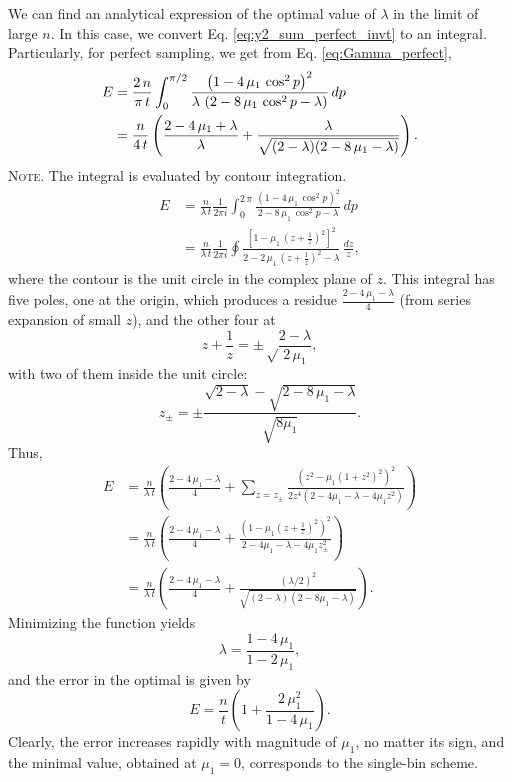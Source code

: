 \documentclass[reprint]{revtex4-1}
\newcommand{\note}[1]{{\color{DarkGreen}\footnotesize \textsc{Note.} #1}}
\newcommand{\Err}{E}
\begin{document}
We can find an analytical expression
of the optimal value of $\lambda$
in the limit of large $n$.
%
In this case,
we convert Eq.
\eqref{eq:y2_sum_perfect_invt}
to an integral.
%
Particularly,
for perfect sampling,
we get from Eq. \eqref{eq:Gamma_perfect},
$$
\begin{aligned}
\Err
&=
\frac{2 \, n}{\pi \, t}
\int_0^{\pi/2}
\frac{ \left(1 - 4 \, \mu_1 \, \cos^2 p \right)^2 }
{ \lambda \, \left(2 - 8 \, \mu_1 \, \cos^2 p - \lambda \right) }
\, dp
\notag \\
&=
\frac{n}{4 \, t}
\left(
  \frac{2 - 4 \, \mu_1 + \lambda}{ \lambda }
  +
  \frac{ \lambda }
  { \sqrt{ (2 - \lambda) (2 - 8 \, \mu_1 - \lambda) } }
\right).
\end{aligned}
$$
\note{The integral is evaluated by contour integration.
$$
\begin{aligned}
\Err
&=
\frac{n}{\lambda \, t}
\frac{1}{2 \pi i}
\int_0^{2 \, \pi}
\frac{ \left(1 - 4 \, \mu_1 \, \cos^2 p \right)^2 }
{ 2 - 8 \, \mu_1 \, \cos^2 p - \lambda }
\, dp
\\
&=
\frac{n}{\lambda \, t}
\frac{1}{2 \pi i}
\oint
\frac{ \left[1 - \mu_1 \, \left(z+\frac{1}{z}\right)^2 \right]^2 }
{ 2 - 2 \, \mu_1 \, \left(z + \frac{1}{z}\right)^2 - \lambda }
\, \frac{dz}{z},
\end{aligned}
$$
where the contour is the unit circle
in the complex plane of $z$.
%
This integral has five poles, one at the origin,
which produces a residue $\frac{2 - 4 \, \mu_1 - \lambda}{4}$
(from series expansion of small $z$),
and the other four at
$$
z + \frac{1}{z} = \pm\sqrt\frac{2-\lambda}{2 \, \mu_1},
$$
with two of them inside the unit circle:
$$
z_\pm = \pm \frac{\sqrt{2-\lambda} -\sqrt{2 - 8 \, \mu_1 - \lambda}}
{\sqrt{8 \mu_1}}.
$$
Thus,
$$
\begin{aligned}
\Err
&=
\frac{n}{\lambda \, t}
\left(
 \frac{2 - 4 \, \mu_1 - \lambda}{4}
 +
 \sum_{z = z_{\pm} }
 \frac{ \left(z^2 - \mu_1 (1 + z^2)^2 \right)^2 }
 { 2 z^4 (2 - 4 \mu_1 - \lambda - 4 \mu_1 z^2) }
\right)
\\
&=
\frac{n}{\lambda \, t}
\left(
  \frac{2 - 4 \, \mu_1 - \lambda}{4}
 +
 \frac{ \left(1 - \mu_1 \left(z + \frac{1}{z} \right)^2 \right)^2 }
 { 2 - 4 \mu_1 - \lambda - 4 \mu_1 z_{\pm}^2 }
\right)
\\
&=
\frac{n}{\lambda \, t}
\left(
  \frac{2 - 4 \, \mu_1 - \lambda}{4}
 +
 \frac{ (\lambda/2)^2 }
 { \sqrt{(2-\lambda) (2 - 8 \mu_1 -\lambda)} }
\right).
\end{aligned}
$$
}
%
Minimizing the function yields
%
\begin{equation}
\lambda = \frac{1 - 4 \, \mu_1} { 1 - 2 \, \mu_1 },
\label{eq:lambda_tridiag}
\end{equation}
%
and the error in the optimal is given by
%
\begin{equation}
\Err
=
\frac{n}{t}
\left(
  1+ \frac{2 \, \mu_1^2}{1-4 \, \mu_1}
\right).
\label{eq:error_tridiag}
\end{equation}
%
Clearly, the error
increases rapidly with magnitude of $\mu_1$,
no matter its sign,
and the minimal value, obtained at $\mu_1 = 0$,
corresponds to the single-bin scheme.
\end{document}
